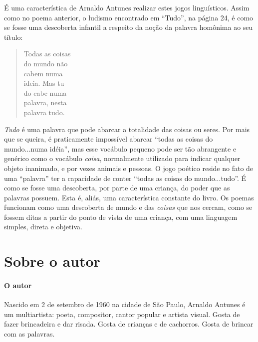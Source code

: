 \documentclass[11pt]{extarticle}
\begin{document}
É uma característica de Arnaldo Antunes realizar estes jogos linguísticos. 
Assim como no
poema anterior, o ludismo encontrado em ``Tudo'', na página 24, é como se fosse uma
descoberta infantil a respeito da noção da palavra homônima ao seu título:

\begin{verse}
Todas as coisas\\
do mundo não\\
cabem numa\\
ideia. Mas tu-\\
do cabe numa\\
palavra, nesta\\
palavra tudo.\\
\end{verse}

\textit{Tudo} é uma palavra que pode abarcar a totalidade das coisas ou seres. Por mais
que se queira, é praticamente impossível abarcar ``todas as coisas do mundo...numa idéia'',
mas esse vocábulo pequeno pode ser tão abrangente e genérico como o vocábulo \textit{coisa},
normalmente utilizado para indicar qualquer objeto inanimado, e por vezes animais e pessoas. 
O jogo poético reside no fato de uma ``palavra'' ter a capacidade de conter ``todas
as coisas do mundo...tudo''. É como se fosse uma descoberta, por parte de uma criança, do
poder que as palavras possuem. Esta é, aliás, uma característica constante do livro. Os
poemas funcionam como uma descoberta de mundo e das \textit{coisas} que nos cercam, como
se fossem ditas a partir do ponto de vista de uma criança, com uma linguagem simples,
direta e objetiva.


\reversemarginpar
\marginparwidth=5cm



\section{Sobre o autor}


\paragraph{O autor}


Nascido em 2 de setembro de 1960 na cidade de São Paulo, Arnaldo Antunes é um multiartista: 
poeta, compositor, cantor popular e artista visual.
Gosta de fazer brincadeira e dar risada. Gosta de crianças e de cachorros.
Gosta de brincar com as palavras.
\end{document}
